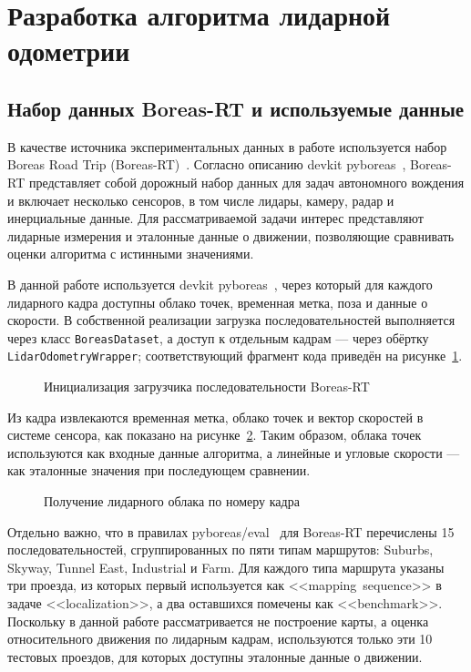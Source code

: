 \section{Разработка алгоритма лидарной одометрии}
\subsection{Набор данных Boreas-RT и используемые данные}
\label{sec:2-1-boreas-rt}

В качестве источника экспериментальных данных в работе используется набор Boreas Road Trip (Boreas-RT)~\cite{boreas-road-trip}. Согласно описанию devkit pyboreas~\cite{pyboreas}, Boreas-RT представляет собой дорожный набор данных для задач автономного вождения и включает несколько сенсоров, в том числе лидары, камеру, радар и инерциальные данные. Для рассматриваемой задачи интерес представляют лидарные измерения и эталонные данные о движении, позволяющие сравнивать оценки алгоритма с истинными значениями.

В данной работе используется devkit pyboreas~\cite{pyboreas}, через который для каждого лидарного кадра доступны облако точек, временная метка, поза и данные о скорости. В собственной реализации загрузка последовательностей выполняется через класс \texttt{BoreasDataset}, а доступ к отдельным кадрам --- через обёртку \texttt{LidarOdometryWrapper}; соответствующий фрагмент кода приведён на рисунке~\ref{lst:boreas-wrapper-init}.

\begin{figure}
  \fontsize{12pt}{14pt}\selectfont
  
  \caption{Инициализация загрузчика последовательности Boreas-RT}
  \label{lst:boreas-wrapper-init}
\end{figure}

Из кадра извлекаются временная метка, облако точек и вектор скоростей в системе сенсора, как показано на рисунке~\ref{lst:boreas-get-frame}. Таким образом, облака точек используются как входные данные алгоритма, а линейные и угловые скорости --- как эталонные значения при последующем сравнении.

\begin{figure}
  \fontsize{12pt}{14pt}\selectfont
  
  \caption{Получение лидарного облака по номеру кадра}
  \label{lst:boreas-get-frame}
\end{figure}

Отдельно важно, что в правилах pyboreas/eval~\cite{pyboreas-eval} для Boreas-RT перечислены 15 последовательностей, сгруппированных по пяти типам маршрутов: Suburbs, Skyway, Tunnel East, Industrial и Farm. Для каждого типа маршрута указаны три проезда, из которых первый используется как <<mapping~sequence>> в задаче <<localization>>, а два оставшихся помечены как <<benchmark>>. Поскольку в данной работе рассматривается не построение карты, а оценка относительного движения по лидарным кадрам, используются только эти 10 тестовых проездов, для которых доступны эталонные данные о движении.

